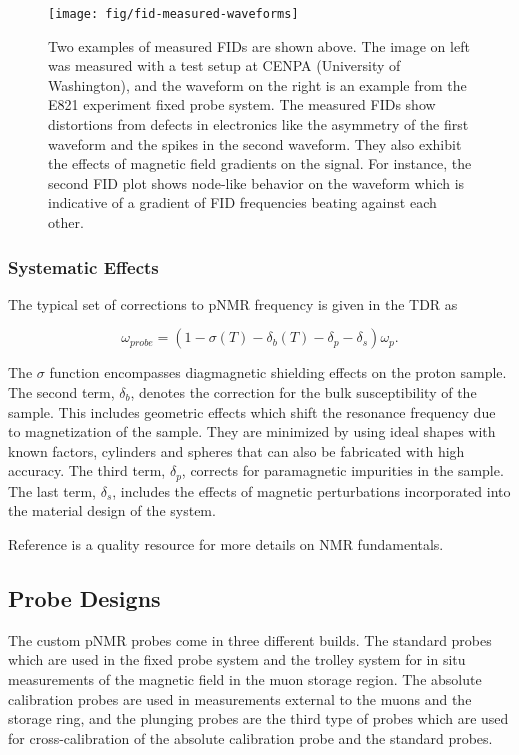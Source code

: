 \begin{figure}
\centering
\texttt{[image: fig/fid-measured-waveforms]}
\caption{
    Two examples of measured FIDs are shown above. The image on left was measured with a test setup at CENPA (University of Washington), and the waveform on the right is an example from the E821 experiment fixed probe system.  The measured FIDs show distortions from defects in electronics like the asymmetry of the first waveform and the spikes in the second waveform.  They also exhibit the effects of magnetic field gradients on the signal.  For instance, the second FID plot shows node-like behavior on the waveform which is indicative of a gradient of FID frequencies beating against each other.
    \label{fig:fid-measured-waveforms}
}
\end{figure}

\subsubsection{Systematic Effects}

The typical set of corrections to pNMR frequency is given in the \mugmtwo TDR \cite{e989-tdr} as

\begin{equation}
\label{eqn:nmr-effects-model}
\omega_{probe} = (1 - \sigma(T) - \delta_b(T) - \delta_p - \delta_s) \omega_p.
\end{equation}

\noindent
The $\sigma$ function encompasses diagmagnetic shielding effects on the proton sample.  The second term, $\delta_b$, denotes the correction for the bulk susceptibility of the sample.  This includes geometric effects which shift the resonance frequency due to magnetization of the sample.  They are minimized by using ideal shapes with known factors, cylinders and spheres that can also be fabricated with high accuracy. The third term, $\delta_p$, corrects for paramagnetic impurities in the sample. The last term, $\delta_s$, includes the effects of magnetic perturbations incorporated into the material design of the system.  

Reference \cite{keeler-nmr} is a quality resource for more details on NMR fundamentals.

\subsection{Probe Designs}

The custom pNMR probes come in three different builds.  The standard probes which are used in the fixed probe system and the trolley system for in situ measurements of the magnetic field in the muon storage region.  The absolute calibration probes are used in measurements external to the muons and the storage ring, and the plunging probes are the third type of probes which are used for cross-calibration of the absolute calibration probe and the standard probes.

